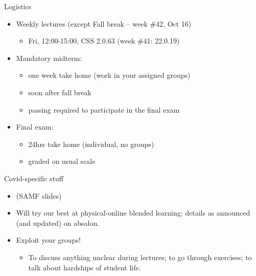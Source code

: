 \documentclass[english,10pt
,aspectratio=169
]{beamer}
\begin{document}
\begin{frame}{Logistics}
\begin{itemize}
	\item Weekly lectures (except Fall break -- week \#42, Oct 16)
	\begin{itemize}
		\item Fri, 12:00-15:00, CSS 2.0.63 (week \#41: 22.0.19)
	\end{itemize}
	
	\pause
	\item Mandatory midterm:
	\begin{itemize}
		\item one week take home (work in your assigned groups)
		\item soon after fall break
		\item passing required to participate in the final exam
	\end{itemize}
	
	\item Final exam:
	\begin{itemize}
		\item 24hrs take home (individual, no groups)
		\item graded on usual scale
	\end{itemize}
\end{itemize}
\end{frame}


\begin{frame}{Covid-specific stuff}
	\begin{itemize}
		\item (SAMF slides)
		\item Will try our best at physical-online blended learning; details as announced (and updated) on absalon.
		\item Exploit your groups!
		\begin{itemize}
			\item To discuss anything unclear during lectures; to go through exercises; to talk about hardships of student life.
		\end{itemize}
	\end{itemize}
\end{frame}
\end{document}
